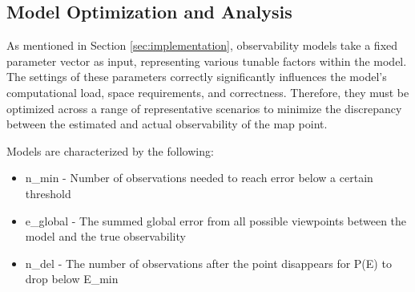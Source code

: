 \subsection{Model Optimization and Analysis}

As mentioned in Section \ref{sec:implementation}, observability models take a fixed parameter vector as input, representing various tunable factors within the model. The settings of these parameters correctly significantly influences the model's computational load, space requirements, and correctness. Therefore, they must be optimized across a range of representative scenarios to minimize the discrepancy between the estimated and actual observability of the map point.

Models are characterized by the following:
\begin{itemize}
  \item n\_min - Number of observations needed to reach error below a certain threshold
  \item e\_global - The summed global error from all possible viewpoints between the model and the true observability
  \item n\_del - The number of observations after the point disappears for P(E) to drop below E\_min
\end{itemize}

\subsubsection{}